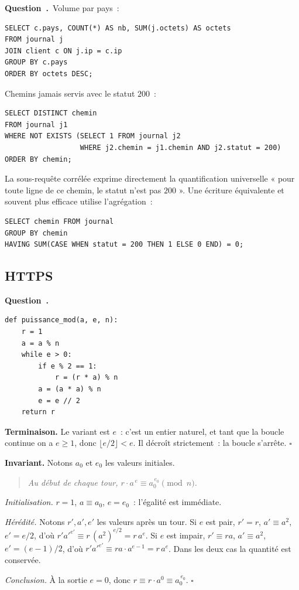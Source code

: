 \documentclass[11pt,a4paper]{article}
\renewcommand{\Q}{\medskip\par\stepcounter{qcnt}\noindent\textbf{\color{cnc}Question~\theqcnt.}~}
\begin{document}
\Q Volume par pays~:
\begin{lstlisting}[style=sql]
SELECT c.pays, COUNT(*) AS nb, SUM(j.octets) AS octets
FROM journal j
JOIN client c ON j.ip = c.ip
GROUP BY c.pays
ORDER BY octets DESC;
\end{lstlisting}
Chemins jamais servis avec le statut $200$~:
\begin{lstlisting}[style=sql]
SELECT DISTINCT chemin
FROM journal j1
WHERE NOT EXISTS (SELECT 1 FROM journal j2
                  WHERE j2.chemin = j1.chemin AND j2.statut = 200)
ORDER BY chemin;
\end{lstlisting}
La sous-requête corrélée exprime directement la quantification universelle « pour toute ligne
de ce chemin, le statut n'est pas $200$ ». Une écriture équivalente et souvent plus efficace
utilise l'agrégation~:
\begin{lstlisting}[style=sql]
SELECT chemin FROM journal
GROUP BY chemin
HAVING SUM(CASE WHEN statut = 200 THEN 1 ELSE 0 END) = 0;
\end{lstlisting}

\subsection*{HTTPS}

\Q
\begin{lstlisting}
def puissance_mod(a, e, n):
    r = 1
    a = a % n
    while e > 0:
        if e % 2 == 1:
            r = (r * a) % n
        a = (a * a) % n
        e = e // 2
    return r
\end{lstlisting}
\textbf{Terminaison.} Le variant est $e$~: c'est un entier naturel, et tant que la boucle
continue on a $e\ge 1$, donc $\lfloor e/2\rfloor<e$. Il décroît strictement~: la boucle
s'arrête. \hfill$\square$

\textbf{Invariant.} Notons $a_0$ et $e_0$ les valeurs initiales.
\begin{quote}\itshape
Au début de chaque tour, $r\cdot a^{\,e}\equiv a_0^{\,e_0} \pmod n$.
\end{quote}
\emph{Initialisation.} $r=1$, $a\equiv a_0$, $e=e_0$~: l'égalité est immédiate.

\emph{Hérédité.} Notons $r',a',e'$ les valeurs après un tour. Si $e$ est pair, $r'=r$,
$a'\equiv a^2$, $e'=e/2$, d'où $r'a'^{e'}\equiv r\,(a^2)^{e/2}=r\,a^{e}$. Si $e$ est impair,
$r'\equiv ra$, $a'\equiv a^{2}$, $e'=(e-1)/2$, d'où
$r'a'^{e'}\equiv ra\cdot a^{e-1}=r\,a^{e}$. Dans les deux cas la quantité est conservée.

\emph{Conclusion.} À la sortie $e=0$, donc $r\equiv r\cdot a^{0}\equiv a_0^{\,e_0}$.
\hfill$\square$
\end{document}
